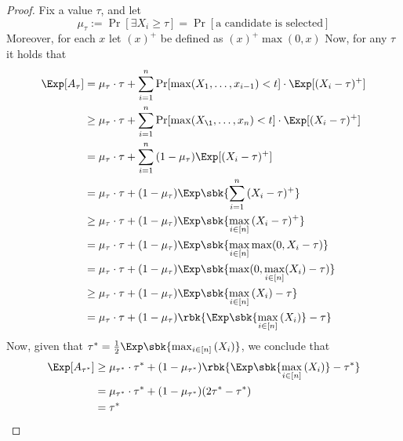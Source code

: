 \documentclass[a4paper, 12pt]{report}
\begin{document}
    \begin{proof}
        Fix a value $\tau$, and let $$\mu_\tau := \Pr[\exists X_i \ge \tau] = \Pr[\mbox{a candidate is selected}]$$ Moreover, for each $x$ let $(x)^+$ be defined as $(x)^+ \max(0, x)$ Now, for any $\tau$ it holds that
        \begin{equation*}
            \begin{split}
                \Exp[A_\tau] &= \mu_\tau \cdot \tau + \sum_{i = 1}^n{\Pr[\max(X_1, \ldots, x_{i -1 }) < t] \cdot \Exp[(X_i - \tau)^+]} \\
                             &\ge \mu_\tau \cdot \tau + \sum_{i = 1}^n{\Pr[\max(X_\1, \ldots, x_n) < t] \cdot \Exp[(X_i - \tau)^+]} \\
                             &= \mu_\tau \cdot \tau + \sum_{i = 1}^n{(1 - \mu_\tau)\Exp[(X_i - \tau)^+]} \\
                             &= \mu_\tau \cdot \tau + (1 - \mu_\tau)\Exp \sbk{\sum_{i = 1}^n{(X_i - \tau)^+}} \\
                             &\ge \mu_\tau \cdot \tau + (1 - \mu_\tau) \Exp\sbk{\max_{i \in [n]}{(X_i - \tau)^+}} \\
                             &= \mu_\tau \cdot \tau + (1 - \mu_\tau) \Exp \sbk{\max_{i \in [n]}{\max(0, X_i - \tau)}} \\
                             &= \mu_\tau \cdot \tau + (1 - \mu_\tau) \Exp \sbk{\max(0, \max_{i \in[n]}(X_i) - \tau)} \\
                             &\ge \mu_\tau \cdot \tau + (1 - \mu_\tau) \Exp \sbk {\max_{i \in [n]}{(X_i)} - \tau} \\
                             &= \mu_\tau \cdot \tau + (1 - \mu_\tau) \rbk{\Exp \sbk{\max_{i \in [n]}{(X_i)}} - \tau}
            \end{split}
        \end{equation*}
        Now, given that $\tau^* = \tfrac{1}{2} \Exp \sbk{\max_{i \in [n]}{(X_i)}}$, we conclude that
        \begin{equation*}
            \begin{split}
                \Exp[A_{\tau^*}] &\ge \mu_{\tau^*} \cdot \tau^* + (1 - \mu_{\tau^*}) \rbk{\Exp\sbk{\max_{i \in [n]}{(X_i)}} - \tau^*} \\
                                 &= \mu_{\tau ^*} \cdot \tau^* + (1 - \mu_{\tau^*}) (2 \tau^* - \tau^*) \\
                                 &= \tau^*
            \end{split}
        \end{equation*}
    \end{proof}
\end{document}
